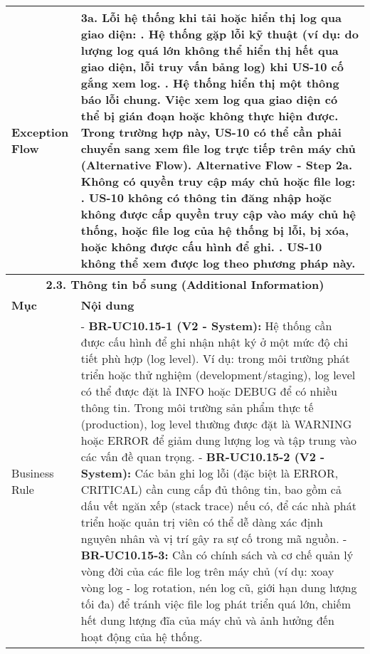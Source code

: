 \begin{longtable}{|m{4cm}|p{11cm}|}
\hline
Exception Flow & \textbf{3a. Lỗi hệ thống khi tải hoặc hiển thị log qua giao diện:} \newline    1. Hệ thống gặp lỗi kỹ thuật (ví dụ: do lượng log quá lớn không thể hiển thị hết qua giao diện, lỗi truy vấn bảng log) khi US-10 cố gắng xem log. \newline    2. Hệ thống hiển thị một thông báo lỗi chung. Việc xem log qua giao diện có thể bị gián đoạn hoặc không thực hiện được. Trong trường hợp này, US-10 có thể cần phải chuyển sang xem file log trực tiếp trên máy chủ (Alternative Flow). \newline \textbf{Alternative Flow - Step 2a. Không có quyền truy cập máy chủ hoặc file log:} \newline    1. US-10 không có thông tin đăng nhập hoặc không được cấp quyền truy cập vào máy chủ hệ thống, hoặc file log của hệ thống bị lỗi, bị xóa, hoặc không được cấu hình để ghi. \newline    2. US-10 không thể xem được log theo phương pháp này. \\
\hline
\multicolumn{2}{|c|}{\textbf{2.3. Thông tin bổ sung (Additional Information)}} \\
\hline
\textbf{Mục} & \textbf{Nội dung} \\
\hline
Business Rule & - \textbf{BR-UC10.15-1 (V2 - System):} Hệ thống cần được cấu hình để ghi nhận nhật ký ở một mức độ chi tiết phù hợp (log level). Ví dụ: trong môi trường phát triển hoặc thử nghiệm (development/staging), log level có thể được đặt là INFO hoặc DEBUG để có nhiều thông tin. Trong môi trường sản phẩm thực tế (production), log level thường được đặt là WARNING hoặc ERROR để giảm dung lượng log và tập trung vào các vấn đề quan trọng. \newline - \textbf{BR-UC10.15-2 (V2 - System):} Các bản ghi log lỗi (đặc biệt là ERROR, CRITICAL) cần cung cấp đủ thông tin, bao gồm cả dấu vết ngăn xếp (stack trace) nếu có, để các nhà phát triển hoặc quản trị viên có thể dễ dàng xác định nguyên nhân và vị trí gây ra sự cố trong mã nguồn. \newline - \textbf{BR-UC10.15-3:} Cần có chính sách và cơ chế quản lý vòng đời của các file log trên máy chủ (ví dụ: xoay vòng log - log rotation, nén log cũ, giới hạn dung lượng tối đa) để tránh việc file log phát triển quá lớn, chiếm hết dung lượng đĩa của máy chủ và ảnh hưởng đến hoạt động của hệ thống. \\
\hline

\end{longtable}
